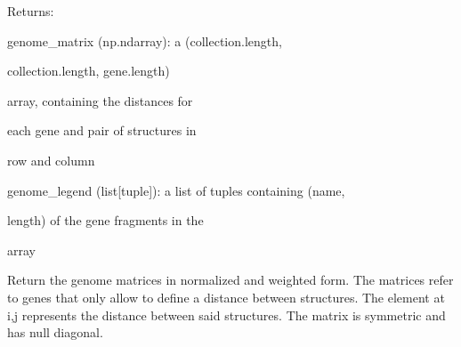 \documentclass[letterpaper,10pt,english]{sphinxmanual}
\begin{document}
\begin{fulllineitems}
\begin{fulllineitems}
\begin{DUlineblock}{0em}
\item[] Returns:
\item[]
\begin{DUlineblock}{\DUlineblockindent}
\item[] genome\_matrix (np.ndarray): a (collection.length,
\item[]
\begin{DUlineblock}{\DUlineblockindent}
\item[] collection.length, gene.length)
\item[] array, containing the distances for
\item[] each gene and pair of structures in
\item[] row and column
\end{DUlineblock}
\item[] genome\_legend (list{[}tuple{]}): a list of tuples containing (name,
\item[]
\begin{DUlineblock}{\DUlineblockindent}
\item[] length) of the gene fragments in the
\item[] array
\end{DUlineblock}
\end{DUlineblock}
\end{DUlineblock}

\end{fulllineitems}


\begin{fulllineitems}
\label{doctree/soprano.analyse.phylogen.phylogenclust:soprano.analyse.phylogen.phylogenclust.PhylogenCluster.get_genome_matrices_norm}
Return the genome matrices in normalized and weighted form.
The matrices refer to genes that only allow to define a distance
between structures. The element at i,j represents the distance
between said structures. The matrix is symmetric and has
null diagonal.


\end{fulllineitems}
\end{fulllineitems}
\end{document}
